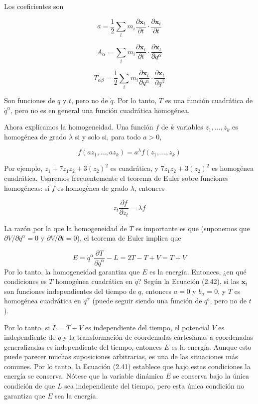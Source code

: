 Los coeficientes son

$$
a = \frac{1}{2} \sum_{i} m_{i} \frac{\partial \mathbf{x}_{t}}{\partial t} \cdot \frac{\partial \mathbf{x}_{t}}{\partial t}
$$

$$
A_{\alpha} = \sum_{i} m_{i} \frac{\partial \mathbf{x}_{t}}{\partial t} \cdot \frac{\partial \mathbf{x}_{t}}{\partial q^{\alpha}} \tag{2.42}
$$

$$
T_{\alpha \beta} = \frac{1}{2} \sum_{i} m_{i} \frac{\partial \mathbf{x}_{t}}{\partial q^{\alpha}} \cdot \frac{\partial \mathbf{x}_{t}}{\partial q^{\beta}}
$$

Son funciones de $q$ y $t$, pero no de $\dot{q}$. Por lo tanto, $T$ es una función cuadrática de $\dot{q}^{\alpha}$, pero no es en general una función cuadrática homogénea.

Ahora explicamos la homogeneidad. Una función $f$ de $k$ variables $z_{1}, \ldots, z_{k}$ es homogénea de grado $\lambda$ si y solo si, para todo $a > 0$,

$$
f(a z_{1}, \ldots, a z_{k}) = a^{\lambda} f(z_{1}, \ldots, z_{k})
$$

Por ejemplo, $z_{1} + 7 z_{1} z_{2} + 3 (z_{2})^{2}$ es cuadrática, y $7 z_{1} z_{2} + 3 (z_{2})^{2}$ es homogénea cuadrática. Usaremos frecuentemente el teorema de Euler sobre funciones homogéneas: si $f$ es homogénea de grado $\lambda$, entonces

$$
z_{t} \frac{\partial f}{\partial z_{t}} = \lambda f
$$

La razón por la que la homogeneidad de $T$ es importante es que (suponemos que $\partial V / \partial \dot{q}^{\alpha} = 0$ y $\partial V / \partial t = 0$), el teorema de Euler implica que

$$
E = \dot{q}^{\alpha} \frac{\partial T}{\partial \dot{q}^{\alpha}} - L = 2 T - T + V = T + V
$$
Por lo tanto, la homogeneidad garantiza que $E$ es la energía. Entonces, ¿en qué condiciones es $T$ homogénea cuadrática en $\dot{q}$? Según la Ecuación (2.42), si las $\mathbf{x}_{t}$ son funciones independientes del tiempo de $q$, entonces $a = 0$ y $b_{\alpha} = 0$, y $T$ es homogénea cuadrática en $\dot{q}^{\alpha}$ (puede seguir siendo una función de $q^{\text{e}}$, pero no de $t$).

Por lo tanto, si $L = T - V$ es independiente del tiempo, el potencial $V$ es independiente de $\dot{q}$ y la transformación de coordenadas cartesianas a coordenadas generalizadas es independiente del tiempo, entonces $E$ es la energía. Aunque esto puede parecer muchas suposiciones arbitrarias, es una de las situaciones más comunes. Por lo tanto, la Ecuación (2.41) establece que bajo estas condiciones la energía se conserva. Nótese que la variable dinámica $E$ se conserva bajo la única condición de que $L$ sea independiente del tiempo, pero esta única condición no garantiza que $E$ sea la energía.
